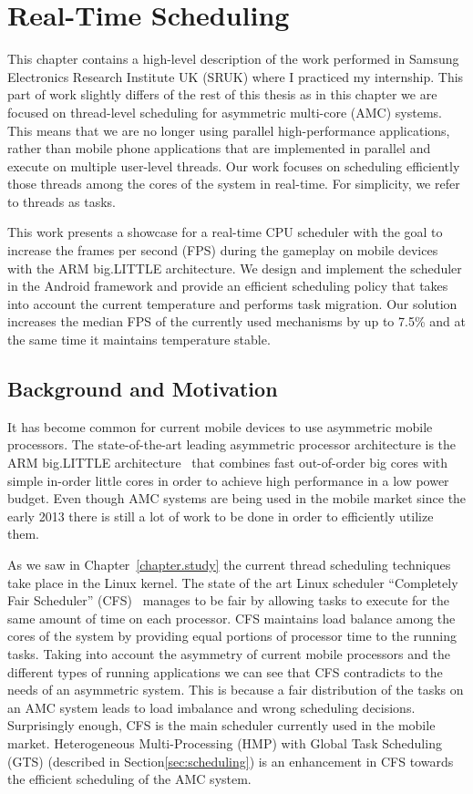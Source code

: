 \chapter{Real-Time Scheduling}
\label{chapter.RTS}
This chapter contains a high-level description of the work performed in Samsung Electronics Research Institute UK (SRUK) where I practiced my internship.
This part of work slightly differs of the rest of this thesis as in this chapter we are focused on thread-level scheduling for asymmetric multi-core (AMC) systems.
This means that we are no longer using parallel high-performance applications, rather than mobile phone applications that are implemented in parallel and execute on multiple user-level threads.
Our work focuses on scheduling efficiently those threads among the cores of the system in real-time.
For simplicity, we refer to threads as tasks.

This work presents a showcase for a real-time CPU scheduler with the goal to increase the frames per second (FPS) during the gameplay on mobile devices with the ARM big.LITTLE architecture. 
We design and implement the scheduler in the Android framework and provide an efficient scheduling policy that takes into account the current temperature and performs task migration. 
Our solution increases the median FPS of the currently used mechanisms by up to 7.5\% and at the same time it maintains temperature stable. 
\newpage

\section{Background and Motivation}
It has become common for current mobile devices to use asymmetric mobile processors. 
The state-of-the-art leading asymmetric processor architecture is the ARM big.LITTLE architecture~\cite{Greenhalgh2011} that combines fast out-of-order big cores with simple in-order little cores in order to achieve high performance in a low power budget. 
Even though AMC systems are being used in the mobile market since the early 2013 there is still a lot of work to be done in order to efficiently utilize them.

As we saw in Chapter~\ref{chapter.study} the current thread scheduling techniques take place in the Linux kernel.
The state of the art Linux scheduler “Completely Fair Scheduler” (CFS)~\cite{CFS} manages to be fair by allowing tasks to execute for the same amount of time on each processor. 
CFS maintains load balance among the cores of the system by providing equal portions of processor time to the running tasks. 
Taking into account the asymmetry of current mobile processors and the different types of running applications we can see that CFS contradicts to the needs of an asymmetric system.
This is because a fair distribution of the tasks on an AMC system leads to load imbalance and wrong scheduling decisions. 
Surprisingly enough, CFS is the main scheduler currently used in the mobile market.
Heterogeneous Multi-Processing (HMP) with Global Task Scheduling (GTS) (described in Section\ref{sec:scheduling}) is an enhancement in CFS towards the efficient scheduling of the AMC system. 

